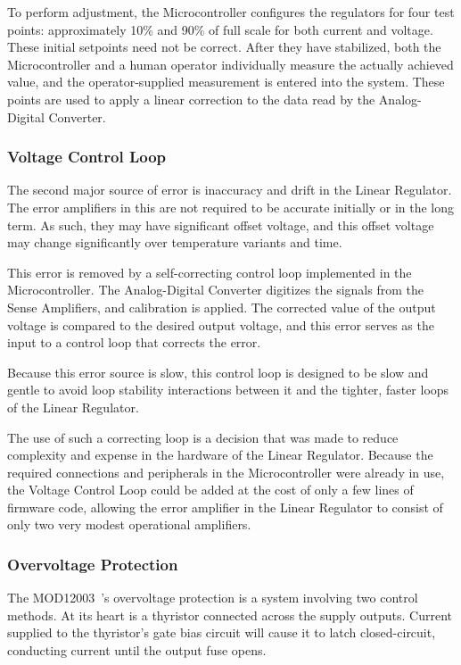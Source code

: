 \documentclass[letterpaper,twocolumn,10pt,openany,oneside,final,fleqn]{memoir}
\newcommand{\Model}{MOD12003\ }
\begin{document}
To perform adjustment, the Microcontroller configures the regulators for four test points:
approximately 10\% and 90\% of full scale for both current and voltage. These initial
setpoints need not be correct. After they have stabilized, both the Microcontroller and
a human operator individually measure the actually achieved value, and the operator-supplied
measurement is entered into the system. These points are used to apply a linear correction
to the data read by the Analog-Digital Converter.

\subsubsection{Voltage Control Loop}

The second major source of error is inaccuracy and drift in the Linear Regulator.
The error amplifiers in this are not required to be accurate initially or in the long
term. As such, they may have significant offset voltage, and this offset voltage may
change significantly over temperature variants and time.

This error is removed by a self-correcting control loop implemented in the Microcontroller.
The Analog-Digital Converter digitizes the signals from the Sense Amplifiers, and calibration
is applied. The corrected value of the output voltage is compared to the desired output
voltage, and this error serves as the input to a control loop that corrects the error.

Because this error source is slow, this control loop is designed to be slow and gentle
to avoid loop stability interactions between it and the tighter, faster loops of the
Linear Regulator.

The use of such a correcting loop is a decision that was made to reduce complexity
and expense in the hardware of the Linear Regulator. Because the required connections
and peripherals in the Microcontroller were already in use, the Voltage Control Loop could
be added at the cost of only a few lines of firmware code, allowing the error amplifier
in the Linear Regulator to consist of only two very modest operational amplifiers.

\subsubsection{Overvoltage Protection}

The \Model's overvoltage protection is a system involving two
control methods. At its heart is a thyristor connected across the supply outputs.
Current supplied to the thyristor's gate bias circuit will cause it to
latch closed-circuit, conducting current until the output fuse opens.
\end{document}
